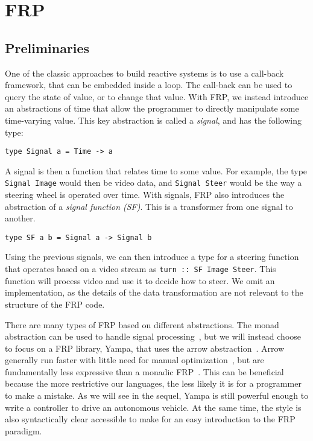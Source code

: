 \section{FRP}

\subsection{Preliminaries}

One of the classic approaches to build reactive systems is to use a call-back framework, that can be embedded inside a loop.
The call-back can be used to query the state of value, or to change that value.
With FRP, we instead introduce an abstractions of time that allow the programmer to directly manipulate some time-varying value.
This key abstraction is called a \textit{signal}, and has the following type:

\begin{lstlisting}
type Signal a = Time -> a
\end{lstlisting}

A signal is then a function that relates time to some value.
For example, the type \texttt{Signal Image} would then be video data, and \texttt{Signal Steer} would be the way a steering wheel is operated over time.
With signals, FRP also introduces the abstraction of a \textit{signal function (SF)}.
This is a transformer from one signal to another.

\begin{lstlisting}
type SF a b = Signal a -> Signal b
\end{lstlisting}

Using the previous signals, we can then introduce a type for a steering function that operates based on a video stream as \texttt{turn :: SF Image Steer}.
This function will process video and use it to decide how to steer.
We omit an implementation, as the details of the data transformation are not relevant to the structure of the FRP code.

There are many types of FRP based on different abstractions.
The monad abstraction can be used to handle signal processing~\cite{van2014monadic},
 but we will instead choose to focus on a FRP library, Yampa, that uses the arrow abstraction~\cite{hudak2003arrows}.
Arrow generally run faster with little need for manual optimization~\cite{yallop2016causal}, but are fundamentally less expressive than a monadic FRP~\cite{lindley2011idioms}.
This can be beneficial because the more restrictive our languages, the less likely it is for a programmer to make a mistake.
As we will see in the sequel, Yampa is still powerful enough to write a controller to drive an autonomous vehicle.
At the same time, the style is also syntactically clear accessible to make for an easy introduction to the FRP paradigm.

